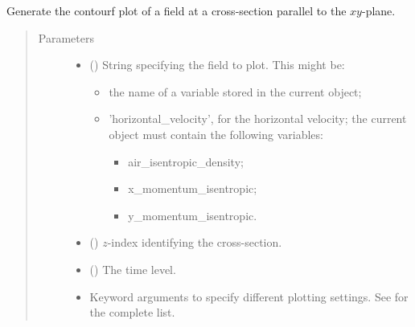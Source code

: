 \documentclass[letterpaper,10pt,english]{sphinxmanual}
\begin{document}
\begin{fulllineitems}
\begin{fulllineitems}
\label{\detokenize{api:tasmania.storages.state_isentropic.StateIsentropic.contourf_xy}}
Generate the contourf plot of a field at a cross-section parallel to the \(xy\)-plane.
\begin{quote}\begin{description}
\item[{Parameters}] \leavevmode\begin{itemize}
\item {} 
 () \textendash{} 
String specifying the field to plot. This might be:
\begin{itemize}
\item {} 
the name of a variable stored in the current object;

\item {} 
’horizontal\_velocity’, for the horizontal velocity; the current object must contain the                               following variables:
\begin{itemize}
\item {} 
air\_isentropic\_density;

\item {} 
x\_momentum\_isentropic;

\item {} 
y\_momentum\_isentropic.

\end{itemize}

\end{itemize}


\item {} 
 () \textendash{} \(z\)-index identifying the cross-section.

\item {} 
 () \textendash{} The time level.

\item {} 
 \textendash{} Keyword arguments to specify different plotting settings.
See {\hyperref[\detokenize{api:tasmania.utils.utils_plot.contourf_xy}]{}} for the complete list.

\end{itemize}


\end{description}
\end{quote}
\end{fulllineitems}
\end{fulllineitems}
\end{document}
